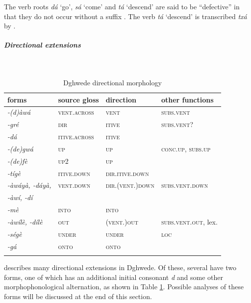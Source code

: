 The verb roots \textit{dá} `go', \textit{sá} `come' and \textit{tá} `descend' are said to be ``defective'' in that they do not occur without a suffix \citep[12]{frickVerbalSystemDghwede1978}. The verb \textit{tá} `descend' is transcribed \textit{txá} by \citet[27]{frickPhonologyDghwede1977}.

\subparagraph{Directional extensions}~

\begin{table}[H]
	\caption{Dghwede directional morphology}
	\label{tab:dghw}
	\begin{tabular}{llll} %
		\lsptoprule
		forms & source gloss & direction  & other functions  \\ %
		\midrule
		\textit{-(d)àwá}  &  \textsc{vent.across}  &   \textsc{vent}  &   \textsc{subs.vent}  \\		
		\textit{-gré}  &  \textsc{dir}  &   \textsc{itive} &   \textsc{subs.vent}?  \\
		\textit{-dá}  &  \textsc{itive.across}  &  \textsc{itive}  &    \\
		\textit{-(de)gwá}  &  \textsc{up}  & \textsc{up}  &  \textsc{conc.up}, \textsc{subs.up} \\
		\textit{-(de)fè} & \textsc{up2} & \textsc{up}  &  \\
		\textit{-tígè}  &  \textsc{itive.down}  &   \textsc{dir.itive.down} &   \\
		\textit{-àwáyà, -dáyà,}  &  \textsc{vent.down}  &  \textsc{dir.(vent.)down}  & \textsc{subs.vent.down}   \\
		\textit{-àwí, -dí} & & & \\
		\textit{-mè}  &  \textsc{into}  &   \textsc{into}  &    \\		
		\textit{-àwílè, -dílè}  &  \textsc{out}  &  \textsc{(vent.)out}  &  \textsc{subs.vent.out}, lex. \\	
		\textit{-ségè}  &  \textsc{under}  &  \textsc{under}   &   \textsc{loc} \\
		\textit{-gá}  &  \textsc{onto}  &  \textsc{onto}   &  \\
		\lspbottomrule
	\end{tabular}
\end{table} 

\citet{frickVerbalSystemDghwede1978} describes many directional extensions in Dghwede. Of these, several have two forms, one of which has an additional initial consonant \textit{d} and some other morphophonological alternation, as shown in Table \ref{tab:dghw}. Possible analyses of these forms will be discussed at the end of this section. 

